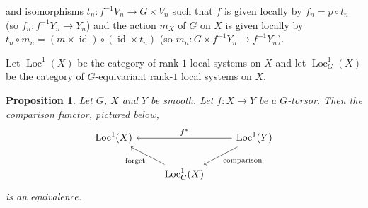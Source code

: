 \documentclass[10pt]{amsart}
\theoremstyle{plain}
\newtheorem{proposition}[theorem]{Proposition}
\theoremstyle{definition}
\DeclareMathOperator{\id}{id}
\DeclareMathOperator{\Loc}{Loc}
\begin{document}
and isomorphisms ${t}_n : f^{-1}{V}_n \to {G}\times {V}_n$ such that  ${f}$ is given locally by ${f}_n = p \circ {t}_n$ (so ${f}_n : {f}^{-1}{Y}_n \to {Y}_n$) and the action ${m}_{X}$ of ${G}$ on ${X}$ is given locally by ${t}_n \circ {m}_n =  ({m} \times \id) \circ (\id\times{t}_n)$ (so ${m}_n : {G}\times{f}^{-1}{Y}_n \to {f}^{-1}{Y}_n$). 

Let $\Loc^1(X)$ be the category of rank-$1$ local systems on $X$ and let $\Loc_G^1(X)$ be the category of $G$-equivariant rank-$1$ local systems on $X$.

\begin{proposition}
Let $G$, $X$ and $Y$ be smooth.
Let $f : X \to Y$ be a $G$-torsor.
Then the comparison functor, pictured below,
\[
\begin{tikzcd}
\Loc^1(X) 
&&\arrow{ll}[swap]{f^*} 
\Loc^1(Y) \arrow{dl}{\text{comparison}}\\
& \arrow{ul}{\text{forget}} \Loc^1_G(X) & 
\end{tikzcd}
\]
is an equivalence.
\end{proposition}
\end{document}
